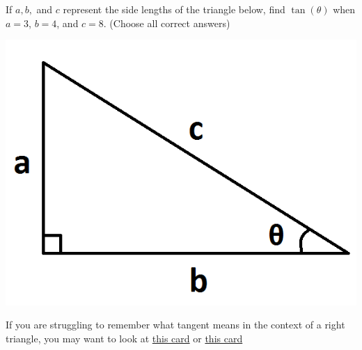 \documentclass{ximera}
\begin{document}
\begin{problem} 

\begin{problem}
    
    If $a, b,$ and $c$ represent the side lengths of the triangle below, find $\tan(\theta)$ when $a = 3$, $b = 4$, and $c = 8$.  (Choose all correct answers)
    
\begin{center} \includegraphics[scale=0.5]{Triangle.png} \end{center}
    
    \begin{hint}
    \begin{hint}
    If you are struggling to remember what tangent means in the context of a right triangle, you may want to look at \href{https://ximera.osu.edu/math160fa17/m160prerequisites/prerequisiteVideos/trigUnitCircle}{this card} or \href{https://ximera.osu.edu/math160fa17/m160prerequisites/reviewOfFamousFunctions/digInTrigonometricFunctions}{this card}
    \end{hint}
    \end{hint}

  \begin{selectAll}
      

\end{selectAll}
\end{problem}
\end{problem}
\end{document}
